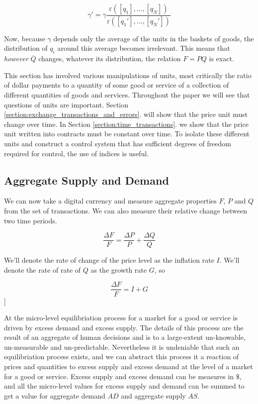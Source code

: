 \begin{equation}
    \gamma' =  \gamma \frac {\varepsilon \left( \left[ q_1 \right], \dots, \left[ q_N \right] \right)}
    {\varepsilon \left( \left[ {q_1}' \right], \dots, \left[ {q_N}' \right] \right)}
\end{equation}

Now, because $\gamma$ depends only the average of the units in the baskets of goods, the distribution of
$q_i$ around this average becomes irrelevant. This means that \textit{however} $\overline Q$
changes, whatever its distribution, the relation $F=PQ$ is exact.  

This section has involved various manipulations of units, most critically the ratio of dollar
payments to a quantity of some good or service of a collection of different quantities of goods and
services. Throughout the paper we will see that questions of units are important. Section
\ref{section:exchange_transactions_and_errors}. will show that the price unit must change over
time. In Section \ref{section:time_transactions}. we show that the price unit written into
contracts must be constant over time. To isolate these different units and construct a control
system that has sufficient degrees of freedom required for control, the use of indices is useful.

\subsection{Aggregate Supply and Demand}
\label{section:aggregate_supply_and_demand}

We can now take a digital currency and measure aggregate properties $F$, $P$ and $Q$ from the set of
transactions. We can also measure their relative change between two time periods.

\[
    \frac {\Delta F} F = \frac {\Delta P} P + \frac {\Delta Q} Q
\]

We'll denote the rate of change of the price level as the inflation rate $I$. We'll denote the rate
of rate of $Q$ as the growth rate $G$, so

\begin{equation}
    \label{equation:fig}
    \frac {\Delta F} F = I + G
\end{equation}]

At the micro-level equilibriation process for a market for a good or service is driven by excess
demand and excess supply. The details of this process are the result of an aggregate of human
decisions and is to a large-extent un-knowable, un-measurable and un-predictable. Nevertheless it is
undeniable that such an equilibriation process exists, and we can abstract this process it a
reaction of prices and quantities to excess supply and excess demand at the level of a market for a
good or service. Excess supply and excess demand can be measures in $\$$, and all the micro-level
values for excess supply and demand can be summed to get a value for aggregate demand $AD$ and
aggregate supply $AS$.  

